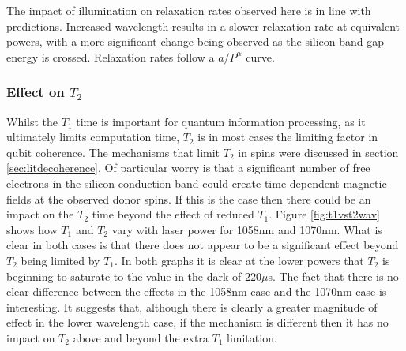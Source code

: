 The impact of illumination on relaxation rates observed here is in line with predictions.
Increased wavelength results in a slower relaxation rate at equivalent powers, with a more significant change being observed as the silicon band gap energy is crossed.
Relaxation rates follow a $a/P^{\alpha}$ curve.

\subsubsection{Effect on $T_2$}

Whilst the $T_1$ time is important for quantum information processing, as it ultimately limits computation time, $T_2$ is in most cases the limiting factor in qubit coherence.
The mechanisms that limit $T_2$ in spins were discussed in section \ref{sec:litdecoherence}.
Of particular worry is that a significant number of free electrons in the silicon conduction band could create time dependent magnetic fields at the observed donor spins. 
If this is the case then there could be an impact on the $T_2$ time beyond the effect of reduced $T_1$.
Figure \ref{fig:t1vst2wav} shows how $T_1$ and $T_2$ vary with laser power for 1058nm and 1070nm.
What is clear in both cases is that there does not appear to be a significant effect beyond $T_2$ being limited by $T_1$.
In both graphs it is clear at the lower powers that $T_2$ is beginning to saturate to the value in the dark of $220\mu$s.
The fact that there is no clear difference between the effects in the 1058nm case and the 1070nm case is interesting. 
It suggests that, although there is clearly a greater magnitude of effect in the lower wavelength case, if the mechanism is different then it has no impact on $T_2$ above and beyond the extra $T_1$ limitation.


